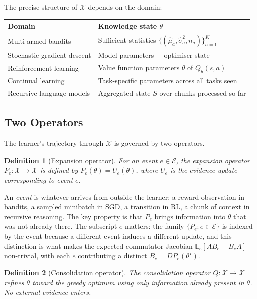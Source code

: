 \documentclass[12pt,a4paper]{article}
\newtheorem{definition}{Definition}[section]
\newcommand{\X}{\mathcal{X}}
\newcommand{\E}{\mathcal{E}}
\begin{document}
The precise structure of $\X$ depends on the domain:

\begin{center}
\begin{tabular}{ll}
\toprule
\textbf{Domain} & \textbf{Knowledge state $\theta$} \\
\midrule
Multi-armed bandits     & Sufficient statistics $\{(\hat\mu_a, \hat\sigma_a^2, n_a)\}_{a=1}^K$ \\
Stochastic gradient descent & Model parameters + optimiser state \\
Reinforcement learning  & Value function parameters $\theta$ of $Q_\theta(s,a)$ \\
Continual learning      & Task-specific parameters across all tasks seen \\
Recursive language models & Aggregated state $S$ over chunks processed so far \\
\bottomrule
\end{tabular}
\end{center}

\subsection{Two Operators}
\label{sec:operators}

The learner's trajectory through $\X$ is governed by two operators.

\begin{definition}[Expansion operator]
\label{def:expansion}
For an event $e \in \E$, the \emph{expansion operator}
$P_e : \X \to \X$ is defined by $P_e(\theta) = U_e(\theta)$,
where $U_e$ is the evidence update corresponding to event $e$.
\end{definition}

An \emph{event} is whatever arrives from outside the learner: a reward
observation in bandits, a sampled minibatch in SGD, a transition in RL,
a chunk of context in recursive reasoning. The
key property is that $P_e$ brings information into $\theta$ that was not
already there. The subscript $e$ matters: the family $\{P_e : e \in
\E\}$ is indexed by the event because a different event induces a different
update, and this distinction is what makes the expected commutator
Jacobian $\mathbb{E}_e[AB_e - B_eA]$ non-trivial, with each $e$ contributing a distinct
$B_e = DP_e(\theta^\star)$.

\begin{definition}[Consolidation operator]
\label{def:consolidation}
The \emph{consolidation operator} $Q : \X \to \X$ refines $\theta$ toward the
greedy optimum using only information already present in $\theta$. No external
evidence enters.
\end{definition}
\end{document}
